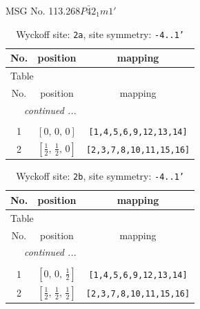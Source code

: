 \documentclass[fleqn,8pt]{jsarticle}
\begin{document}
\setcounter{MaxMatrixCols}{32}

\renewcommand{\tablename}{Table~}
\renewcommand{\figurename}{Figure~}
\begin{center}
\LARGE
MSG No. 113.268\quad$P\bar{4}2_{1}m1'$
\end{center}
\renewcommand{\arraystretch}{1.2}
\begin{longtable}{ccc}
\caption{Wyckoff site: {\tt 2a}, site symmetry: {\tt -4..1'}}
 \\
 \hline \hline
No. & position & mapping \\ \hline \endfirsthead

\multicolumn{2}{l}{\tablename\ \thetable{}} \\
 \hline \hline
No. & position & mapping \\ \hline \endhead

 \hline \hline
\multicolumn{2}{r}{\footnotesize\it continued ...} \\ \endfoot

 \hline \hline
\multicolumn{2}{r}{} \\ \endlastfoot

1 & $\left[ 0,\, 0,\, 0 \right]$ & {\tt [1,4,5,6,9,12,13,14]} \\ \hline
2 & $\left[ \frac{1}{2},\, \frac{1}{2},\, 0 \right]$ & {\tt [2,3,7,8,10,11,15,16]} \\
\end{longtable}
\renewcommand{\arraystretch}{1.2}
\begin{longtable}{ccc}
\caption{Wyckoff site: {\tt 2b}, site symmetry: {\tt -4..1'}}
 \\
 \hline \hline
No. & position & mapping \\ \hline \endfirsthead

\multicolumn{2}{l}{\tablename\ \thetable{}} \\
 \hline \hline
No. & position & mapping \\ \hline \endhead

 \hline \hline
\multicolumn{2}{r}{\footnotesize\it continued ...} \\ \endfoot

 \hline \hline
\multicolumn{2}{r}{} \\ \endlastfoot

1 & $\left[ 0,\, 0,\, \frac{1}{2} \right]$ & {\tt [1,4,5,6,9,12,13,14]} \\ \hline
2 & $\left[ \frac{1}{2},\, \frac{1}{2},\, \frac{1}{2} \right]$ & {\tt [2,3,7,8,10,11,15,16]} \\
\end{longtable}
\end{document}
